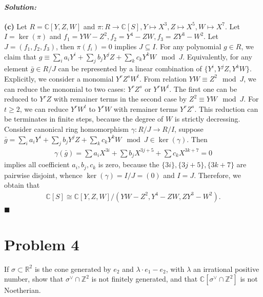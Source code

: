 \documentclass[12pt, a4paper]{article}
\newenvironment{solution}
  {\paragraph{\textit{Solution:}}\par\medskip}
  {\hfill$\blacksquare$\vspace{0.1cm}}
\begin{document}
\begin{solution}
\textbf{(c)}
Let $R = \mathbb{C}[Y, Z, W]$ and 
$
    \pi: R \to \mathbb{C}[S],
    Y\mapsto X^3,
    Z\mapsto X^5,
    W\mapsto X^7
$.
Let $I=\ker(\pi)$ and $f_1 = YW - Z^2,f_2 = Y^4 - ZW,f_3 = ZY^3 - W^2$. Let $J=(f_1,f_2,f_3)$, then $\pi(f_i)=0$ implies $J\subseteq I$. 
For any polynomial $g\in R$, we claim that $g\equiv\sum_{i}a_iY^i+\sum_{j}b_jY^jZ+\sum_{k}c_kY^kW\mod J$. Equivalently, for any element $\bar{g}\in R/J$ can be 
represented by a linear combination of $\{Y^i,Y^jZ,Y^kW\}$. Explicitly, we consider a monomial $Y^rZ^sW^t$. From relation $YW\equiv Z^2\mod J$, we can 
reduce the monomial to two cases: $Y^rZ^s$ or $Y^rW^t$. The first one can be reduced to $Y^rZ$ with remainer terms in the second case by $Z^2\equiv YW\mod J$. 
For $t\ge 2$, we can reduce $Y^rW^t$ to $Y^rW$ with remainer terms $Y^rZ^s$. This reduction can be terminates in finite steps, because the degree of $W$ is strictly decressing.
Consider canonical ring homomorphism $\gamma:R/J\to R/I$, suppose $\bar{g} = \sum_{i}a_iY^i+\sum_{j}b_jY^jZ+\sum_{k}c_kY^kW\mod J\in \ker(\gamma)$. Then 
\begin{align*}
    \gamma(\bar{g}) = \sum a_i X^{3i} + \sum b_jX^{3j+5}+\sum c_kX^{3k+7} = 0
\end{align*}
implies all coefficient $a_i,b_j,c_k$ is zero, because the $\{3i\},\{3j+5\},\{3k+7\}$ are pairwise disjoint, whence $\ker(\gamma)=I/J=(0)$ and $I=J$.
Therefore, we obtain that 
\begin{align*}
    \mathbb{C}[S] \cong  \mathbb{C}[Y, Z, W]/(YW - Z^2,Y^4 - ZW,ZY^3 - W^2).
\end{align*} 
\end{solution}



\section*{Problem 4}
If $\sigma \subset \mathbb{R}^{2}$ is the cone generated by $e_{2}$ and $\lambda \cdot e_{1} - e_{2}$, with $\lambda$ an irrational positive number, show that $\sigma^{\vee} \cap \mathbb{Z}^{2}$ is not finitely generated, and that $\mathbb{C}[\sigma^{\vee} \cap \mathbb{Z}^{2}]$ is not Noetherian.
\end{document}
